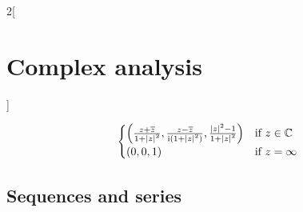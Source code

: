\documentclass[../../../main_math.tex]{subfiles}
\begin{document}
\begin{multicols}{2}[\section{Complex analysis}]
\begin{definition}
$$\begin{cases}
        \left(\frac{z+\overline{z}}{1+\abs{z}^2},\frac{z-\overline{z}}{\mathrm{i}(1+{\abs{z}}^2)},\frac{{\abs{z}}^2-1}{1+{\abs{z}}^2}\right) & \text{if }z\in\mathbb{C}  \\
        (0,0,1)                                                                                                                       & \text{if }z=\infty
      \end{cases}$$
  \end{definition}
  \begin{center}
    \begin{minipage}{\linewidth}
      \centering
      
    \end{minipage}
  \end{center}
  \subsection{Sequences and series}

\end{multicols}
\end{document}
